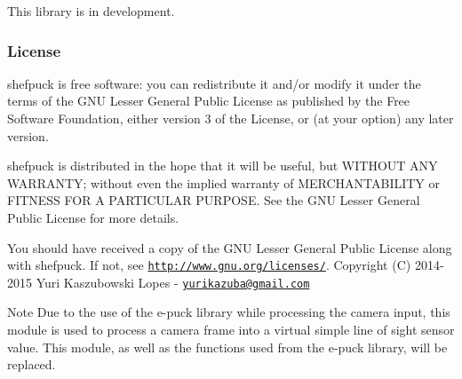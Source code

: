 This library is in development.\hypertarget{group__shefpuck_License}{}\subsubsection{License}\label{group__shefpuck_License}
shefpuck is free software\+: you can redistribute it and/or modify it under the terms of the G\+N\+U Lesser General Public License as published by the Free Software Foundation, either version 3 of the License, or (at your option) any later version.

shefpuck is distributed in the hope that it will be useful, but W\+I\+T\+H\+O\+U\+T A\+N\+Y W\+A\+R\+R\+A\+N\+T\+Y; without even the implied warranty of M\+E\+R\+C\+H\+A\+N\+T\+A\+B\+I\+L\+I\+T\+Y or F\+I\+T\+N\+E\+S\+S F\+O\+R A P\+A\+R\+T\+I\+C\+U\+L\+A\+R P\+U\+R\+P\+O\+S\+E. See the G\+N\+U Lesser General Public License for more details.

You should have received a copy of the G\+N\+U Lesser General Public License along with shefpuck. If not, see \href{http://www.gnu.org/licenses/}{\tt http\+://www.\+gnu.\+org/licenses/}. Copyright (C) 2014-\/2015 Yuri Kaszubowski Lopes -\/ \href{mailto:yurikazuba@gmail.com}{\tt yurikazuba@gmail.\+com}

\begin{DoxyNote}{Note}
Due to the use of the e-\/puck library while processing the camera input, this module is used to process a camera frame into a virtual simple line of sight sensor value. This module, as well as the functions used from the e-\/puck library, will be replaced. 
\end{DoxyNote}
